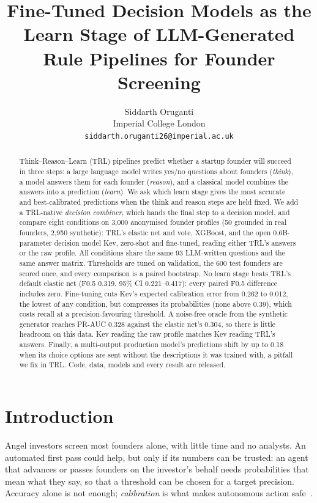 \documentclass{article}
\title{Fine-Tuned Decision Models as the Learn Stage of LLM-Generated Rule Pipelines for Founder Screening}
\author{Siddarth Oruganti \\
Imperial College London \\
\texttt{siddarth.oruganti26@imperial.ac.uk}}
\begin{document}
\maketitle
\lhead{}  %

\begin{abstract}
Think--Reason--Learn (TRL) pipelines predict whether a startup founder will succeed in three
steps: a large language model writes yes/no questions about founders (\emph{think}), a model
answers them for each founder (\emph{reason}), and a classical model combines the answers into
a prediction (\emph{learn}). We ask which learn stage gives the most accurate and best-calibrated
predictions when the think and reason steps are held fixed. We add a TRL-native
\emph{decision combiner}, which hands the final step to a decision model, and compare eight
conditions on 3,000 anonymised founder profiles (50 grounded in real founders, 2,950 synthetic):
TRL's elastic net and vote, XGBoost, and the open 0.6B-parameter decision model Kev, zero-shot
and fine-tuned, reading either TRL's answers or the raw profile. All conditions share the same 93
LLM-written questions and the same answer matrix. Thresholds are tuned on validation, the 600
test founders are scored once, and every comparison is a paired bootstrap. No learn stage beats
TRL's default elastic net (F0.5 0.319, 95\% CI 0.221--0.417): every paired F0.5 difference
includes zero. Fine-tuning cuts Kev's expected calibration error from 0.262 to 0.012, the lowest
of any condition, but compresses its probabilities (none above 0.39), which costs recall at a
precision-favouring threshold. A noise-free oracle from the synthetic generator reaches PR-AUC
0.328 against the elastic net's 0.304, so there is little headroom on this data. Kev reading
the raw profile matches Kev reading TRL's answers. Finally, a multi-output production model's
predictions shift by up to 0.18 when its choice options are sent without the descriptions it was
trained with, a pitfall we fix in TRL. Code, data, models and every result are released.
\end{abstract}

\section{Introduction}

Angel investors screen most founders alone, with little time and no analysts. An automated
first pass could help, but only if its numbers can be trusted: an agent that advances or passes
founders on the investor's behalf needs probabilities that mean what they say, so that a
threshold can be chosen for a target precision. Accuracy alone is not enough; \emph{calibration}
is what makes autonomous action safe~\citep{guo2017calibration}.
\end{document}
